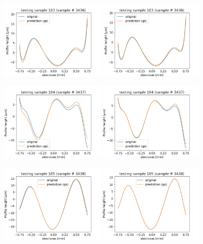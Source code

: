 \documentclass[]{article}
\begin{document}
\begin{figure}
\includegraphics[width=0.45\textwidth]{figures/v20p103.png}
\includegraphics[width=0.45\textwidth]{figures/v23p103.png}

\includegraphics[width=0.45\textwidth]{figures/v20p104.png}
\includegraphics[width=0.45\textwidth]{figures/v23p104.png}

\includegraphics[width=0.45\textwidth]{figures/v20p105.png}
\includegraphics[width=0.45\textwidth]{figures/v23p105.png}
\end{figure}
\end{document}

